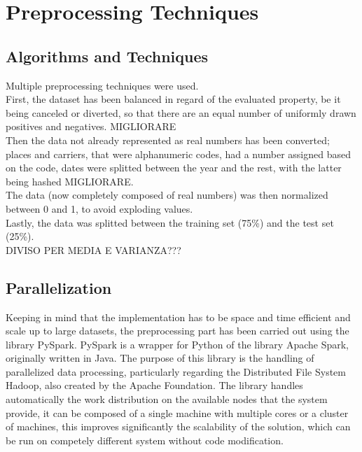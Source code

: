 \documentclass[
	letterpaper, %
	10pt, %
]{class}
\begin{document}

\section{Preprocessing Techniques}

\subsection{Algorithms and Techniques}

Multiple preprocessing techniques were used.\\
First, the dataset has been balanced in regard of the evaluated property, be it being canceled or diverted, so that there are an equal number of uniformly drawn positives and negatives. MIGLIORARE\\
Then the data not already represented as real numbers has been converted; places and carriers, that were alphanumeric codes, had a number assigned based on the code, dates were splitted between the year and the rest, with the latter being hashed MIGLIORARE.\\
The data (now completely composed of real numbers) was then normalized between 0 and 1, to avoid exploding values.\\
Lastly, the data was splitted between the training set (75\%) and the test set (25\%).\\

DIVISO PER MEDIA E VARIANZA???

\subsection{Parallelization}

Keeping in mind that the implementation has to be space and time efficient and scale up to large datasets, the preprocessing part has been carried out using the library PySpark.
PySpark is a wrapper for Python of the library Apache Spark, originally written in Java. The purpose of this library is the handling of parallelized data processing, particularly regarding the Distributed File System Hadoop, also created by the Apache Foundation.
The library handles automatically the work distribution on the available nodes that the system provide, it can be composed of a single machine with multiple cores or a cluster of machines, this improves significantly the scalability of the solution, which can be run on competely different system without code modification.
\end{document}
